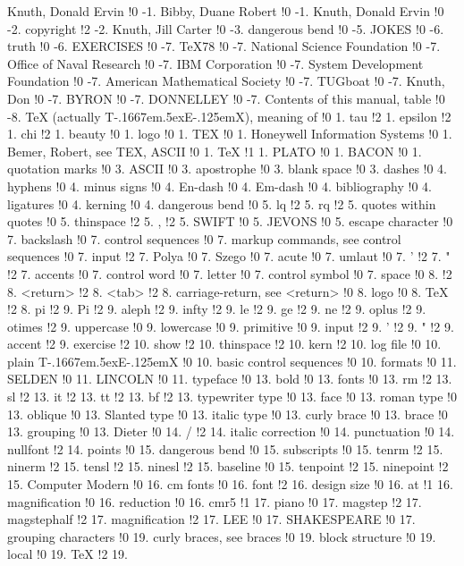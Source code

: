 Knuth, Donald Ervin !0 -1.
Bibby, Duane Robert !0 -1.
Knuth, Donald Ervin !0 -2.
copyright !2 -2.
Knuth, Jill Carter !0 -3.
dangerous bend !0 -5.
JOKES !0 -6.
truth !0 -6.
EXERCISES !0 -7.
TeX78 !0 -7.
National Science Foundation !0 -7.
Office of Naval Research !0 -7.
IBM Corporation !0 -7.
System Development Foundation !0 -7.
American Mathematical Society !0 -7.
TUGboat !0 -7.
Knuth, Don !0 -7.
BYRON !0 -7.
DONNELLEY !0 -7.
Contents of this manual, table !0 -8.
TeX (actually T\kern -.1667em\lower .5ex\hbox {E}\kern -.125emX), meaning of !0 1.
tau !2 1.
epsilon !2 1.
chi !2 1.
beauty !0 1.
logo !0 1.
TEX !0 1.
Honeywell Information Systems !0 1.
Bemer, Robert, see TEX, ASCII !0 1.
TeX !1 1.
PLATO !0 1.
BACON !0 1.
quotation marks !0 3.
ASCII !0 3.
apostrophe !0 3.
blank space !0 3.
dashes !0 4.
hyphens !0 4.
minus signs !0 4.
En-dash !0 4.
Em-dash !0 4.
bibliography !0 4.
ligatures !0 4.
kerning !0 4.
dangerous bend !0 5.
lq !2 5.
rq !2 5.
quotes within quotes !0 5.
thinspace !2 5.
, !2 5.
SWIFT !0 5.
JEVONS !0 5.
escape character !0 7.
backslash !0 7.
control sequences !0 7.
markup commands, see control sequences !0 7.
input !2 7.
Polya !0 7.
Szego !0 7.
acute !0 7.
umlaut !0 7.
' !2 7.
" !2 7.
accents !0 7.
control word !0 7.
letter !0 7.
control symbol !0 7.
space !0 8.
  !2 8.
<return> !2 8.
<tab> !2 8.
carriage-return, see <return> !0 8.
logo !0 8.
TeX !2 8.
pi !2 9.
Pi !2 9.
aleph !2 9.
infty !2 9.
le !2 9.
ge !2 9.
ne !2 9.
oplus !2 9.
otimes !2 9.
uppercase !0 9.
lowercase !0 9.
primitive !0 9.
input !2 9.
' !2 9.
" !2 9.
accent !2 9.
exercise !2 10.
show !2 10.
thinspace !2 10.
kern !2 10.
log file !0 10.
plain T\kern -.1667em\lower .5ex\hbox {E}\kern -.125emX !0 10.
basic control sequences !0 10.
formats !0 11.
SELDEN !0 11.
LINCOLN !0 11.
typeface !0 13.
bold !0 13.
fonts !0 13.
rm !2 13.
sl !2 13.
it !2 13.
tt !2 13.
bf !2 13.
typewriter type !0 13.
face !0 13.
roman type !0 13.
oblique !0 13.
Slanted type !0 13.
italic type !0 13.
curly brace !0 13.
brace !0 13.
grouping !0 13.
Dieter !0 14.
/ !2 14.
italic correction !0 14.
punctuation !0 14.
nullfont !2 14.
points !0 15.
dangerous bend !0 15.
subscripts !0 15.
tenrm !2 15.
ninerm !2 15.
tensl !2 15.
ninesl !2 15.
baseline !0 15.
tenpoint !2 15.
ninepoint !2 15.
Computer Modern !0 16.
cm fonts !0 16.
font !2 16.
design size !0 16.
at !1 16.
magnification !0 16.
reduction !0 16.
cmr5 !1 17.
piano !0 17.
magstep !2 17.
magstephalf !2 17.
magnification !2 17.
LEE !0 17.
SHAKESPEARE !0 17.
grouping characters !0 19.
curly braces, see braces !0 19.
block structure !0 19.
local !0 19.
TeX !2 19.
